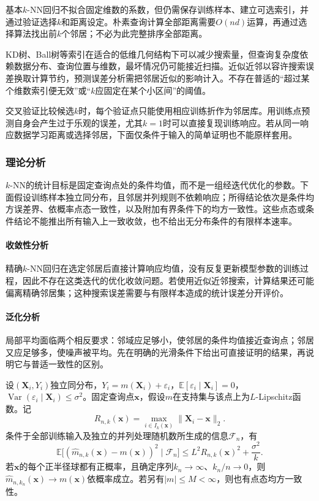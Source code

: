 基本$k$-NN回归不拟合固定维数的系数，但仍需保存训练样本、建立可选索引，并通过验证选择$k$和距离设定。朴素查询计算全部距离需要$O(nd)$运算，再通过选择算法找出前$k$个邻居；不必为此完整排序全部距离。

KD树、Ball树等索引在适合的低维几何结构下可以减少搜索量，但查询复杂度依赖数据分布、查询位置与维数，最坏情况仍可能接近扫描。近似近邻以容许搜索误差换取计算节约，预测误差分析需把邻居近似的影响计入。不存在普适的“超过某个维数索引便无效”或“$k$应固定在某个小区间”的阈值。

交叉验证比较候选$k$时，每个验证点只能使用相应训练折作为邻居库。用训练点预测自身会产生过于乐观的误差，尤其$k=1$时可以直接复现训练响应。若从同一响应数据学习距离或选择邻居，下面仅条件于输入的简单证明也不能原样套用。

\subsubsection{理论分析}
\label{sec:regression-knn-theory}

$k$-NN的统计目标是固定查询点处的条件均值，而不是一组经迭代优化的参数。下面假设训练样本独立同分布，且邻居并列规则不依赖响应；所得结论依次是条件均方误差界、依概率点态一致性，以及附加有界条件下的均方一致性。这些点态或条件结论不能推出所有输入上一致收敛，也不给出无分布条件的有限样本速率。

\paragraph{收敛性分析}
精确$k$-NN回归在选定邻居后直接计算响应均值，没有反复更新模型参数的训练过程，因此不存在这类迭代的优化收敛问题。若使用近似近邻搜索，计算结果还可能偏离精确邻居集；这种搜索误差需要与有限样本造成的统计误差分开评价。

\paragraph{泛化分析}
局部平均面临两个相反要求：邻域应足够小，使邻居的条件均值接近查询点；邻居又应足够多，使噪声被平均。先在明确的光滑条件下给出可直接证明的结果，再说明它与普适一致性的区别。

\begin{theorem}[$k$-NN回归的条件误差与点态一致性]
  \label{thm:regression-knn}
  设$(\bm{X}_i,Y_i)$独立同分布，$Y_i=m(\bm{X}_i)+\varepsilon_i$，$\mathbb{E}[\varepsilon_i\mid\bm{X}_i]=0$，$\operatorname{Var}(\varepsilon_i\mid\bm{X}_i)\leq\sigma^2$。固定查询点$\bm{x}$，假设$m$在支持集与该点上为$L$-Lipschitz函数。记
  \[
    R_{n,k}(\bm{x})=\max_{i\in I_k(\bm{x})}
       \lVert\bm{X}_i-\bm{x}\rVert_2.
  \]
  条件于全部训练输入及独立的并列处理随机数所生成的信息$\mathcal F_n$，有
  \[
    \mathbb{E}\bigl[
      (\widehat m_{n,k}(\bm{x})-m(\bm{x}))^2\mid\mathcal F_n\bigr]
    \leq L^2R_{n,k}(\bm{x})^2+\frac{\sigma^2}{k}.
  \]
  若$\bm{x}$的每个正半径球都有正概率，且确定序列$k_n\to\infty$、$k_n/n\to0$，则$\widehat m_{n,k_n}(\bm{x})\to m(\bm{x})$依概率成立。若另有$|m|\leq M<\infty$，则也有点态均方一致性。
\end{theorem}

